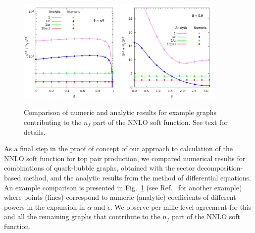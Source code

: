 \documentclass{PoS}
\begin{document}
\begin{figure}[t]
 \begin{center}
 \includegraphics[width=0.45\textwidth]{../../vp-terms/plots/bubble-beta13.png}
 \hfill
 \includegraphics[width=0.45\textwidth]{../../vp-terms/plots/bubble-theta13.png}
 \end{center}
 \caption{
 Comparison of numeric and analytic results for example graphs contributing to
 the $n_f$ part of the NNLO soft function. See text for details.
 }
 \label{fig:compG13}
\end{figure}


As a final step in the proof of concept of our approach to calculation of the
NNLO soft function for top pair production, we compared numerical results for
combinations of quark-bubble graphs, obtained with the sector
decomposition-based method, and the analytic results from the method of
differential equations. An example comparison is presented in
Fig.~\ref{fig:compG13} (see Ref.~\cite{ReneMttD} for another example) where
points (lines) correspond to numeric (analytic) coefficients of different powers
in the expansion in $\alpha$ and $\epsilon$. We observe per-mille-level
agreement for this and all the remaining graphs that contribute to the $n_f$
part of the NNLO soft function.

\end{document}
